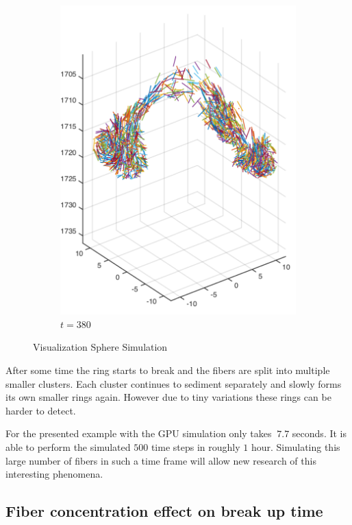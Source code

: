 \documentclass[a4paper,11pt]{kth-mag}
\begin{document}
\begin{figure}[!htbp]
\begin{subfigure}[h]{0.4\textwidth}
    \includegraphics[width=\textwidth]{img/state_00380.pdf}
    \caption{$t=380$}\label{fig:sphere_simulation_1d}
  \end{subfigure}
  \caption{Visualization Sphere Simulation}
  \label{fig:sphere_simulation}
\end{figure}

After some time the ring starts to break and the fibers are split into multiple smaller clusters. Each cluster continues to sediment separately and slowly forms its own smaller rings again. However due to tiny variations these rings can be harder to detect.

For the presented example with the GPU simulation only takes $~7.7$ seconds. It is able to perform the simulated $500$ time steps in roughly $1$ hour. Simulating this large number of fibers in such a time frame will allow new research of this interesting phenomena.

\subsection{Fiber concentration effect on break up time}
\end{document}
